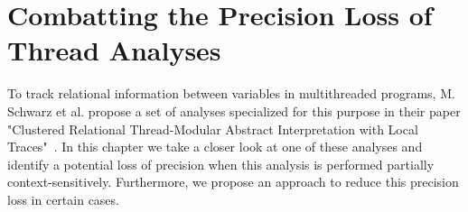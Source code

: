 
\chapter{Combatting the Precision Loss of Thread Analyses}\label{chapter:precisionLossThreadAnalyses}
  To track relational information between variables in multithreaded programs, M. Schwarz et al. propose a set of analyses specialized for this purpose in their paper "Clustered Relational Thread-Modular Abstract Interpretation with Local Traces"~\parencite{schwarz2023clustered}. In this chapter we take a closer look at one of these analyses and identify a potential loss of precision when this analysis is performed partially context-sensitively. Furthermore, we propose an approach to reduce this precision loss in certain cases.
